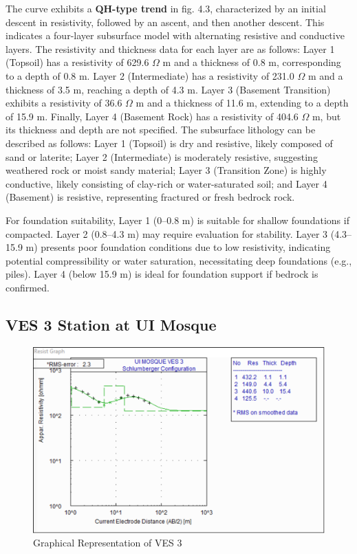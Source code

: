 \documentclass[12pt,a4paper]{report}
\begin{document}
The curve exhibits a \textbf{QH-type trend} in fig. 4.3, characterized by an initial descent in resistivity, followed by an ascent, and then another descent. This indicates a four-layer subsurface model with alternating resistive and conductive layers. The resistivity and thickness data for each layer are as follows: Layer 1 (Topsoil) has a resistivity of 629.6 $\Omega$ m and a thickness of 0.8 m, corresponding to a depth of 0.8 m. Layer 2 (Intermediate) has a resistivity of 231.0 $\Omega$ m and a thickness of 3.5 m, reaching a depth of 4.3 m. Layer 3 (Basement Transition) exhibits a resistivity of 36.6 $\Omega$ m and a thickness of 11.6 m, extending to a depth of 15.9 m. Finally, Layer 4 (Basement Rock) has a resistivity of 404.6 $\Omega$ m, but its thickness and depth are not specified. The subsurface lithology can be described as follows: Layer 1 (Topsoil) is dry and resistive, likely composed of sand or laterite; Layer 2 (Intermediate) is moderately resistive, suggesting weathered rock or moist sandy material; Layer 3 (Transition Zone) is highly conductive, likely consisting of clay-rich or water-saturated soil; and Layer 4 (Basement) is resistive, representing fractured or fresh bedrock rock.

For foundation suitability, Layer 1 (0--0.8 m) is suitable for shallow foundations if compacted. Layer 2 (0.8--4.3 m) may require evaluation for stability. Layer 3 (4.3--15.9 m) presents poor foundation conditions due to low resistivity, indicating potential compressibility or water saturation, necessitating deep foundations (e.g., piles). Layer 4 (below 15.9 m) is ideal for foundation support if bedrock is confirmed.
\subsection{VES 3 Station at UI Mosque}

\begin{figure}[H]
    \centering
    \includegraphics[width=1.0\textwidth]{ui_ves3.png}
    \caption{Graphical Representation of VES 3}
    \label{fig:VES_3_Curve}
\end{figure}
\end{document}

